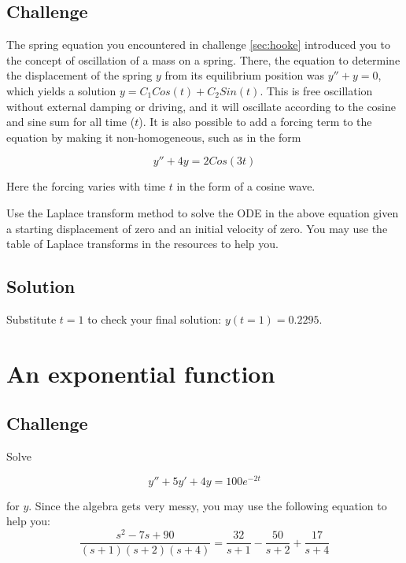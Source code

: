 \subsection*{Challenge}
The spring equation you encountered in challenge \ref{sec:hooke} introduced you to the concept of oscillation of a mass on a spring. There, the equation to determine the displacement of the spring $y$ from its equilibrium position was $y''+y=0$, which yields a solution $y=C_1 Cos(t) + C_2 Sin(t)$. This is free oscillation without external damping or driving, and it will oscillate according to the cosine and sine sum for all time ($t$). It is also possible to add a forcing term to the equation by making it non-homogeneous, such as in the form

\begin{equation}
    y'' + 4y = 2 Cos(3t)
\end{equation}

Here the forcing varies with time $t$ in the form of a cosine wave.

Use the Laplace transform method to solve the ODE in the above equation given a starting displacement of zero and an initial velocity of zero. You may use the table of Laplace transforms in the resources to help you.

\subsection*{Solution}
Substitute $t=1$ to check your final solution: $y(t=1)=0.2295$.




\newpage
\section{An exponential function}

\subsection*{Challenge}
Solve

\begin{equation}
    y''+5y'+4y=100e^{-2t}
\end{equation}

for $y$. Since the algebra gets very messy, you may use the following equation to help you:
\begin{equation}
    \frac{s^2-7s+90}{(s+1)(s+2)(s+4)} = \frac{32}{s+1} - \frac{50}{s+2} + \frac{17}{s+4}
\end{equation}


